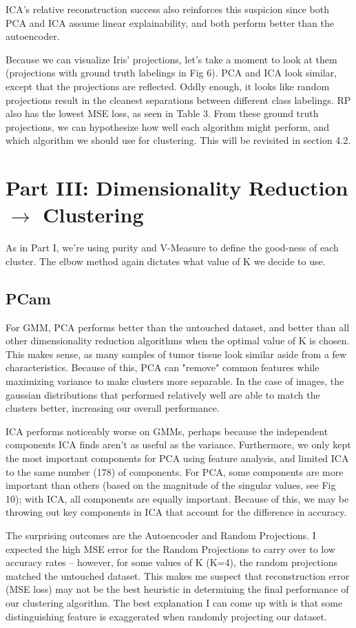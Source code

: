 \documentclass[letter]{article}
\begin{document}
ICA's relative reconstruction success also reinforces this suspicion since both PCA and ICA assume linear explainability, and both perform better than the autoencoder.

Because we can visualize Iris' projections, let's take a moment to look at them (projections with ground truth labelings in Fig 6). PCA and ICA look similar, except that the projections are reflected. Oddly enough, it looks like random projections result in the cleanest separations between different class labelings. RP also has the lowest MSE loss, as seen in Table 3. From these ground truth projections, we can hypothesize how well each algorithm might perform, and which algorithm we should use for clustering. This will be revisited in section 4.2.

\section{Part III: Dimensionality Reduction $\rightarrow$ Clustering}
As in Part I, we're using purity and V-Measure to define the good-ness of each cluster. The elbow method again dictates what value of K we decide to use.

\subsection{PCam}
For GMM, PCA performs better than the untouched dataset, and better than all other dimensionality reduction algorithms when the optimal value of K is chosen. This makes sense, as many samples of tumor tissue look similar aside from a few characteristics. Because of this, PCA can "remove" common features while maximizing variance to make clusters more separable. In the case of images, the gaussian distributions that performed relatively well are able to match the clusters better, increasing our overall performance. 

ICA performs noticeably worse on GMMs, perhaps because the independent components ICA finds aren't as useful as the variance. Furthermore, we only kept the most important components for PCA using feature analysis, and limited ICA to the same number (178) of components. For PCA, some components are more important than others (based on the magnitude of the singular values, see Fig 10); with ICA, all components are equally important. Because of this, we may be throwing out key components in ICA that account for the difference in accuracy.

The surprising outcomes are the Autoencoder and Random Projections. I expected the high MSE error for the Random Projections to carry over to low accuracy rates -- however, for some values of K (K=4), the random projections matched the untouched dataset. This makes me suspect that reconstruction error (MSE loss) may not be the best heuristic in determining the final performance of our clustering algorithm. The best explanation I can come up with is that some distinguishing feature is exaggerated when randomly projecting our dataset.
\end{document}
